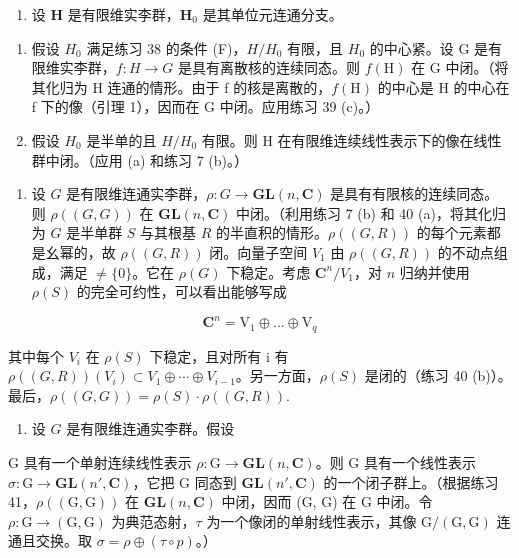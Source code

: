\begin{enumerate}
\def\labelenumi{\arabic{enumi}.}
\setcounter{enumi}{39}
\tightlist
\item
  设 \(\mathbf{H}\) 是有限维实李群，\(\mathbf{H}_0\) 是其单位元连通分支。
\end{enumerate}

\begin{enumerate}
\def\labelenumi{(\alph{enumi})}
\item
  假设 \(H_{0}\) 满足练习 38 的条件 (F)，\(H/H_{0}\) 有限，且 \(H_{0}\) 的中心紧。设 G 是有限维实李群，\(f:H\to G\) 是具有离散核的连续同态。则 \(f(\mathrm{H})\) 在 G 中闭。（将其化归为 H 连通的情形。由于 f 的核是离散的，\(f(\mathrm{H})\) 的中心是 H 的中心在 f 下的像（引理 1），因而在 G 中闭。应用练习 39 (c)。）
\item
  假设 \(H_{0}\) 是半单的且 \(H/H_{0}\) 有限。则 H 在有限维连续线性表示下的像在线性群中闭。（应用 (a) 和练习 7 (b)。）
\end{enumerate}

\begin{enumerate}
\def\labelenumi{\arabic{enumi}.}
\setcounter{enumi}{40}
\tightlist
\item
  设 \(G\) 是有限维连通实李群，\(\rho: G \to \mathbf{GL}(n, \mathbf{C})\) 是具有有限核的连续同态。则 \(\rho((G, G))\) 在 \(\mathbf{GL}(n, \mathbf{C})\) 中闭。（利用练习 7 (b) 和 40 (a)，将其化归为 \(G\) 是半单群 \(S\) 与其根基 \(R\) 的半直积的情形。\(\rho((G, R))\) 的每个元素都是幺幂的，故 \(\rho((G, R))\) 闭。向量子空间 \(V_1\) 由 \(\rho((G, R))\) 的不动点组成，满足 \(\neq \{0\}\)。它在 \(\rho(G)\) 下稳定。考虑 \(\mathbf{C}^n / V_1\)，对 \(n\) 归纳并使用 \(\rho(S)\) 的完全可约性，可以看出能够写成
\end{enumerate}

\[
\mathbf {C} ^ {n} = \mathrm{V} _ {1} \oplus \dots \oplus \mathrm{V} _ {q}
\]

其中每个 \(V_{i}\) 在 \(\rho(S)\) 下稳定，且对所有 i 有 \(\rho((G,R))(V_{i})\subset V_{1}\oplus\cdots\oplus V_{i-1}\)。另一方面，\(\rho(S)\) 是闭的（练习 40 (b)）。最后，\(\rho((G,G))=\rho(S)\cdot\rho((G,R)).\)

\begin{enumerate}
\def\labelenumi{\arabic{enumi}.}
\setcounter{enumi}{41}
\tightlist
\item
  设 \(G\) 是有限维连通实李群。假设
\end{enumerate}

G 具有一个单射连续线性表示 \(\rho: \mathrm{G} \to \mathbf{GL}(n, \mathbf{C})\)。则 G 具有一个线性表示 \(\sigma: \mathrm{G} \to \mathbf{GL}(n', \mathbf{C})\)，它把 G 同态到 \(\mathbf{GL}(n', \mathbf{C})\) 的一个闭子群上。（根据练习 41，\(\rho((\mathrm{G}, \mathrm{G}))\) 在 \(\mathbf{GL}(n, \mathbf{C})\) 中闭，因而 (G, G) 在 G 中闭。令 \(\rho: \mathrm{G} \to (\mathrm{G}, \mathrm{G})\) 为典范态射，\(\tau\) 为一个像闭的单射线性表示，其像 \(\mathrm{G}/(\mathrm{G}, \mathrm{G})\) 连通且交换。取 \(\sigma = \rho \oplus (\tau \circ p)\)。）

